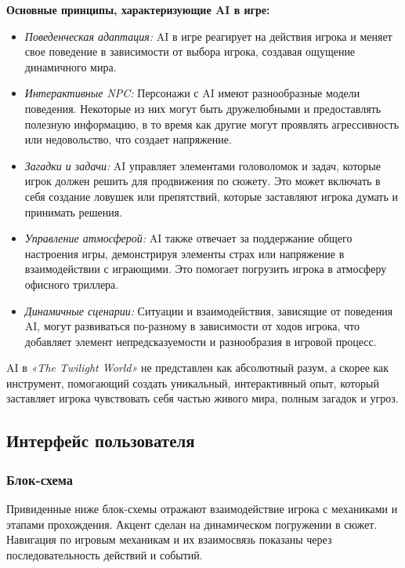 \documentclass{article}
\begin{document}
	\textbf{Основные принципы, характеризующие AI в игре:}
	\begin{itemize}
		\item\textit{Поведенческая адаптация:} AI в игре реагирует на действия игрока и меняет свое поведение в зависимости от выбора игрока, создавая ощущение динамичного мира.
		
		\item\textit{Интерактивные NPC:} Персонажи с AI имеют разнообразные модели поведения. Некоторые из них могут быть дружелюбными и предоставлять полезную информацию, в то время как другие могут проявлять агрессивность или недовольство, что создает напряжение.
		
		\item\textit{Загадки и задачи:} AI управляет элементами головоломок и задач, которые игрок должен решить для продвижения по сюжету. Это может включать в себя создание ловушек или препятствий, которые заставляют игрока думать и принимать решения.
		
		\item\textit{Управление атмосферой:} AI также отвечает за поддержание общего настроения игры, демонстрируя элементы страх или напряжение в взаимодействии с играющими. Это помогает погрузить игрока в атмосферу офисного триллера.
		
		\item\textit{Динамичные сценарии:} Ситуации и взаимодействия, зависящие от поведения AI, могут развиваться по-разному в зависимости от ходов игрока, что добавляет элемент непредсказуемости и разнообразия в игровой процесс.
	\end{itemize}
	AI в \textit{«The Twilight World»} не представлен как абсолютный разум, а скорее как инструмент, помогающий создать уникальный, интерактивный опыт, который заставляет игрока чувствовать себя частью живого мира, полным загадок и угроз.\\
	
	\subsection{Интерфейс пользователя}
	
	\subsubsection{Блок-схема}
	
	Привиденные ниже блок-схемы отражают взаимодействие игрока с механиками и этапами прохождения. Акцент сделан на динамическом погружении в сюжет. Навигация по игровым механикам и их взаимосвязь показаны через последовательность действий и событий.
	
\end{document}
